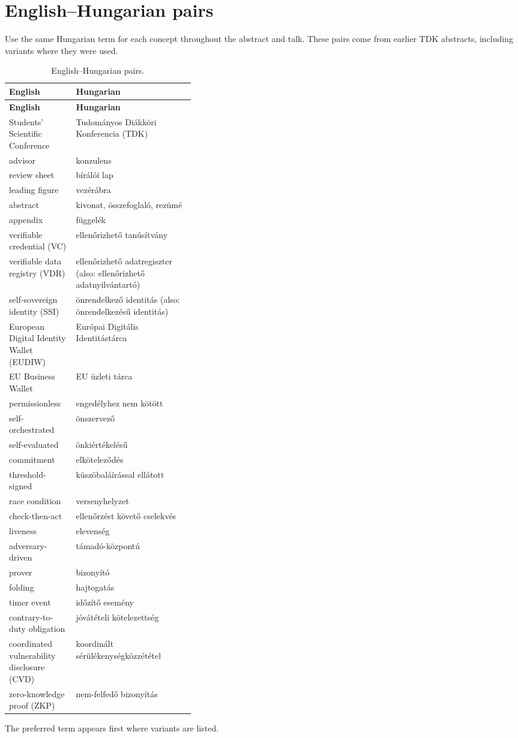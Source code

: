 \section{English--Hungarian pairs}
Use the same Hungarian term for each concept throughout the abstract and talk. These pairs come from earlier TDK abstracts, including variants where they were used.
{\small
\begin{xltabular}{\linewidth}{>{\raggedright\arraybackslash}p{0.36\linewidth} >{\raggedright\arraybackslash}X}
  \caption{English--Hungarian pairs.}\label{tab:glossary-hu}\\
  \toprule \textbf{English} & \textbf{Hungarian} \\ \midrule \endfirsthead
  \toprule \textbf{English} & \textbf{Hungarian} \\ \midrule \endhead
  \bottomrule \endlastfoot
  Students' Scientific Conference & Tudományos Diákköri Konferencia (TDK) \\
  advisor & konzulens \\
  review sheet & bírálói lap \\
  leading figure & vezérábra \\
  abstract & kivonat, összefoglaló, rezümé \\
  appendix & függelék \\
  verifiable credential (VC) & ellenőrizhető tanúsítvány \\
  verifiable data registry (VDR) & ellenőrizhető adatregiszter (also: ellenőrizhető adatnyilvántartó) \\
  self-sovereign identity (SSI) & önrendelkező identitás (also: önrendelkezésű identitás) \\
  European Digital Identity Wallet (EUDIW) & Európai Digitális Identitástárca \\
  EU Business Wallet & EU üzleti tárca \\
  permissionless & engedélyhez nem kötött \\
  self-orchestrated & önszervező \\
  self-evaluated & önkiértékelésű \\
  commitment & elköteleződés \\
  threshold-signed & küszöbaláírással ellátott \\
  race condition & versenyhelyzet \\
  check-then-act & ellenőrzést követő cselekvés \\
  liveness & elevenség \\
  adversary-driven & támadó-központú \\
  prover & bizonyító \\
  folding & hajtogatás \\
  timer event & időzítő esemény \\
  contrary-to-duty obligation & jóvátételi kötelezettség \\
  coordinated vulnerability disclosure (CVD) & koordinált sérülékenységközzététel \\
  zero-knowledge proof (ZKP) & nem-felfedő bizonyítás \\
\end{xltabular}
}
The preferred term appears first where variants are listed.

